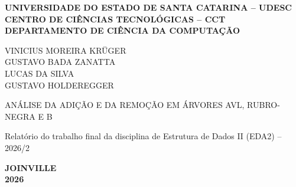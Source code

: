 \begin{titlingpage}
\thispagestyle{empty}
\begin{center}
\bfseries
UNIVERSIDADE DO ESTADO DE SANTA CATARINA -- UDESC\\
CENTRO DE CIÊNCIAS TECNOLÓGICAS -- CCT\\
DEPARTAMENTO DE CIÊNCIA DA COMPUTAÇÃO

\vspace*{3.1cm}
VINICIUS MOREIRA KRÜGER\\
GUSTAVO BADA ZANATTA\\
LUCAS DA SILVA\\
GUSTAVO HOLDEREGGER

\vspace*{3.2cm}
ANÁLISE DA ADIÇÃO E DA REMOÇÃO EM ÁRVORES AVL, RUBRO-NEGRA E B

\vspace{0.6cm}
\normalfont
Relatório do trabalho final da disciplina de Estrutura de Dados II (EDA2) -- 2026/2

\vfill
\bfseries
JOINVILLE\\
2026
\end{center}
\end{titlingpage}
